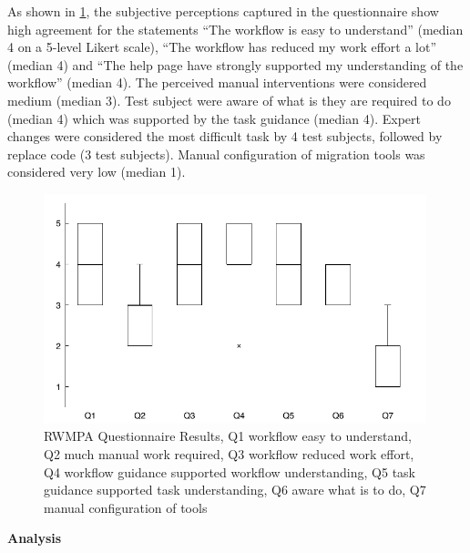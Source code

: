 As shown in \cref{fig:rwmpa.boxplot}, the subjective perceptions captured in the questionnaire show high agreement for the statements ``The workflow is easy to understand'' (median 4 on a 5-level Likert scale), ``The workflow has reduced my work effort a lot'' (median 4) and ``The help page have strongly supported my understanding of the workflow'' (median 4).
The perceived manual interventions were considered medium (median 3).
Test subject were aware of what is they are required to do (median 4) which was supported by the task guidance (median 4).
Expert changes were considered the most difficult task by 4 test subjects, followed by replace code (3 test subjects).
Manual configuration of migration tools was considered very low (median 1).


\begin{figure}
\hypertarget{fig:rwmpa.boxplot}{%
\centering
\includegraphics[width=0.99\textwidth]{../figures/boxplots/rwmpa-boxplot.pdf}
\caption{RWMPA Questionnaire Results, Q1 workflow easy to understand, Q2 much manual work required, Q3 workflow reduced work effort, Q4 workflow guidance supported workflow understanding, Q5 task guidance supported task understanding, Q6 aware what is to do, Q7 manual configuration of tools}\label{fig:rwmpa.boxplot}
}
\end{figure}

\textbf{Analysis}


